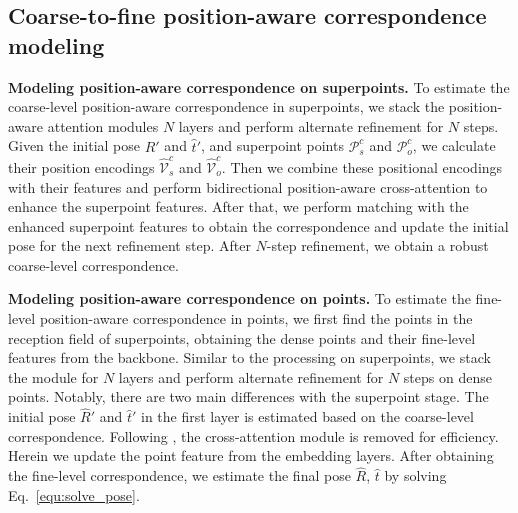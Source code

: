 \subsection{Coarse-to-fine position-aware correspondence modeling}
\noindent\textbf{Modeling position-aware correspondence on superpoints.}
To estimate the coarse-level position-aware correspondence in superpoints, we stack the position-aware attention modules  $N$ layers and perform alternate refinement for $N$ steps. 
Given the initial pose $\hat{R}'$ and $\hat{t}'$, and superpoint points $\mathcal{P}_s^c$ and $\mathcal{P}_o^c$, we calculate their position encodings $\hat{\mathcal{V}}_s^c$ and $\hat{\mathcal{V}}_o^c$. Then we combine these positional encodings with their features and perform bidirectional position-aware cross-attention to enhance the superpoint features. After that, we perform matching with the enhanced superpoint features to obtain the correspondence and update the initial pose for the next refinement step. After $N$-step refinement, we obtain a robust coarse-level correspondence.

\vspace{1mm}
\noindent\textbf{Modeling position-aware correspondence on points.}
To estimate the fine-level position-aware correspondence in points, we first find the points in the reception field of superpoints, obtaining the dense points and their fine-level features from the backbone.
Similar to the processing on superpoints, we stack the module for $N$ layers and perform alternate refinement for $N$ steps on dense points. Notably, there are two main differences with the superpoint stage. The initial pose $\hat{R}'$ and $\hat{t}'$ in the first layer is estimated based on the coarse-level correspondence. Following \cite{qin2023geotransformer, chen2023zeropose}, the cross-attention module is removed for efficiency. Herein we update the point feature from the embedding layers. After obtaining the fine-level correspondence, we estimate the final pose $\hat{R}$, $\hat{t}$ by solving Eq.~\eqref{equ:solve_pose}.
